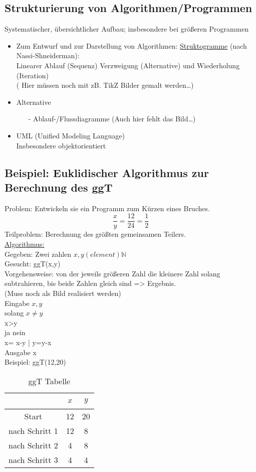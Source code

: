 \subsection{Strukturierung von Algorithmen/Programmen}
Systematischer, übersichtlicher Aufbau; insbesondere bei größeren Programmen
\begin{itemize}
\item Zum Entwurf und zur Darstellung von Algorithmen: \underline{Struktogramme} (nach Nassi-Shneiderman): \\
Linearer Ablauf (Sequenz) Verzweigung (Alternative) und Wiederholung (Iteration) \\
( Hier müssen noch mit zB. TikZ Bilder gemalt werden\dots )
\item Alternative
\begin{itemize}
\item[-] Ablauf-/Flussdiagramme (Auch hier fehlt das Bild\dots)
\end{itemize}
\item UML (Unified Modeling Language) \\
Insbesondere objektorientiert
\end{itemize}
\subsection{Beispiel: Euklidischer Algorithmus zur Berechnung des ggT}
Problem: Entwickeln sie ein Programm zum Kürzen eines Bruches.
\[
\frac{x}{y} = \frac{12}{24} = \frac{1}{2}
\]
Teilproblem: Berechnung des größten gemeinsamen Teilers. \\
\underline{Algorithmus:} \\
Gegeben: Zwei zahlen $x,y (element) \mathbb{N}$ \\
Gesucht: ggT(x,y) \\
Vorgehensweise: von der jeweils größeren Zahl die kleinere Zahl solang subtrahieren, bis beide Zahlen gleich sind => Ergebnis. \\
(Muss noch als Bild realisiert werden) \\
Eingabe $x,y$ \\
solang $x \neq y$ \\
 x>y \\
 ja	nein \\
 x= x-y | y=y-x \\
Ausgabe x \\
Beispiel: ggT(12,20)
\begin{table}[h]
	\caption[ggT Beispiel]{ggT Tabelle}
	\begin{center}
	\begin{tabular}{c|c|c}
		~& $x$ & $y$\\
		\hline
		Start & 12 & 20\\
		nach Schritt 1 & 12 & 8 \\
		nach Schritt 2 & 4 & 8 \\
		nach Schritt 3 & 4 & 4 \\
	\end{tabular}
	\end{center}
\end{table}

